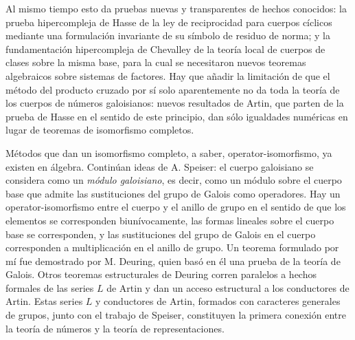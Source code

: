 Al mismo tiempo esto da pruebas nuevas y transparentes de hechos conocidos: la prueba hipercompleja de Hasse de la ley de reciprocidad para cuerpos cíclicos mediante una formulación invariante de su símbolo de residuo de norma; y la fundamentación hipercompleja de Chevalley de la teoría local de cuerpos de clases sobre la misma base, para la cual se necesitaron nuevos teoremas algebraicos sobre sistemas de factores. Hay que añadir la limitación de que el método del producto cruzado por sí solo aparentemente no da toda la teoría de los cuerpos de números galoisianos: nuevos resultados de Artin, que parten de la prueba de Hasse en el sentido de este principio, dan sólo igualdades numéricas en lugar de teoremas de isomorfismo completos.

Métodos que dan un isomorfismo completo, a saber, operator-isomorfismo, ya existen en álgebra. Continúan ideas de A. Speiser: el cuerpo galoisiano se considera como un \emph{módulo galoisiano}, es decir, como un módulo sobre el cuerpo base que admite las sustituciones del grupo de Galois como operadores. Hay un operator-isomorfismo entre el cuerpo y el anillo de grupo en el sentido de que los elementos se corresponden biunívocamente, las formas lineales sobre el cuerpo base se corresponden, y las sustituciones del grupo de Galois en el cuerpo corresponden a multiplicación en el anillo de grupo. Un teorema formulado por mí fue demostrado por M. Deuring, quien basó en él una prueba de la teoría de Galois. Otros teoremas estructurales de Deuring corren paralelos a hechos formales de las series \(L\) de Artin y dan un acceso estructural a los conductores de Artin. Estas series \(L\) y conductores de Artin, formados con caracteres generales de grupos, junto con el trabajo de Speiser, constituyen la primera conexión entre la teoría de números y la teoría de representaciones.

